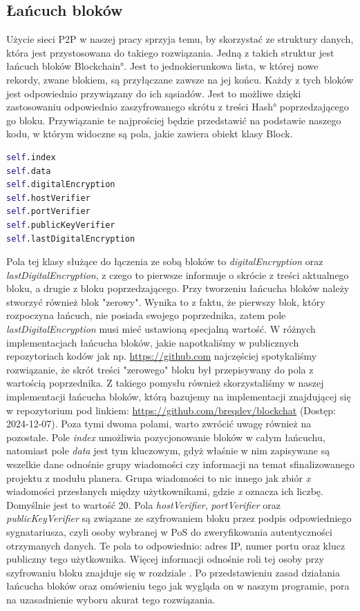 \subsection{Łańcuch bloków}
\label{sec:Blockchain}
Użycie sieci P2P w naszej pracy sprzyja temu, by skorzystać ze struktury danych, która jest przystosowana do takiego rozwiązania. Jedną z takich struktur jest łańcuch bloków \ang{Blockchain}. Jest to jednokierunkowa lista, w której nowe rekordy, zwane blokiem, są przyłączane zawsze na jej końcu. Każdy z tych bloków jest odpowiednio przywiązany do ich sąsiadów. Jest to możliwe dzięki zastosowaniu odpowiednio zaszyfrowanego skrótu z treści \ang{Hash} poprzedzającego go bloku. Przywiązanie te najprościej będzie przedstawić na podstawie naszego kodu, w którym widoczne są pola, jakie zawiera obiekt klasy Block.
\begin{lstlisting}[language=Python, extendedchars=true, caption={Pola obiektu klasy Block}]
self.index
self.data
self.digitalEncryption
self.hostVerifier
self.portVerifier
self.publicKeyVerifier
self.lastDigitalEncryption
\end{lstlisting}
Pola tej klasy służące do łączenia ze sobą bloków to \textit{digitalEncryption} oraz \textit{lastDigitalEncryption}, z czego to pierwsze informuje o skrócie z treści aktualnego bloku, a drugie z bloku poprzedzającego. Przy tworzeniu łańcucha bloków należy stworzyć również blok "zerowy". Wynika to z faktu, że pierwszy blok, który rozpoczyna łańcuch, nie posiada swojego poprzednika, zatem pole \textit{lastDigitalEncryption} musi mieć ustawioną specjalną wartość. W różnych implementacjach łańcucha bloków, jakie napotkaliśmy w publicznych repozytoriach kodów jak np. \url{https://github.com} najczęściej spotykaliśmy rozwiązanie, że skrót treści "zerowego" bloku był przepisywany do pola z  wartością poprzednika. Z takiego pomysłu również skorzystaliśmy w naszej implementacji łańcucha bloków, którą bazujemy na implementacji znajdującej się w repozytorium pod linkiem: \url{https://github.com/breqdev/blockchat} (Dostęp: 2024-12-07). Poza tymi dwoma polami, warto zwrócić uwagę również na pozostałe. Pole \textit{index} umożliwia pozycjonowanie bloków w całym łańcuchu, natomiast pole \textit{data} jest tym kluczowym, gdyż właśnie w nim zapisywane są wszelkie dane odnośnie grupy wiadomości czy informacji na temat sfinalizowanego projektu z modułu planera. Grupa wiadomości to nic innego jak zbiór \textit{x} wiadomości przesłanych między użytkownikami, gdzie \textit{x} oznacza ich liczbę. Domyślnie jest to wartość 20. Pola \textit{hostVerifier}, \textit{portVerifier} oraz \textit{publicKeyVerifier} są związane ze szyfrowaniem bloku przez podpis odpowiedniego sygnatariusza, czyli osoby wybranej w PoS do zweryfikowania autentyczności otrzymanych danych. Te pola to odpowiednio: adres IP, numer portu oraz klucz publiczny tego użytkownika. Więcej informacji odnośnie roli tej osoby przy szyfrowaniu bloku znajduje się w rozdziale . Po przedstawieniu zasad działania łańcucha bloków oraz omówieniu tego jak wygląda on w naszym programie, pora na uzasadnienie wyboru akurat tego rozwiązania.
